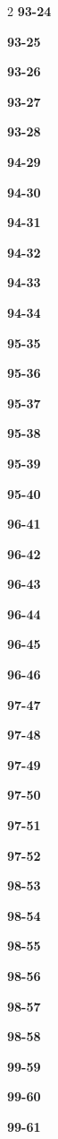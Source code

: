 \documentclass[10pt,a4paper]{article}
\begin{document}
\begin{multicols}{2}
\noindent\textbf{93-24}\ \par
\noindent\textbf{93-25}\ \par
\noindent\textbf{93-26}\ \par
\noindent\textbf{93-27}\ \par
\noindent\textbf{93-28}\ \par
\noindent\textbf{94-29}\ \par
\noindent\textbf{94-30}\ \par
\noindent\textbf{94-31}\ \par
\noindent\textbf{94-32}\ \par
\noindent\textbf{94-33}\ \par
\noindent\textbf{94-34}\ \par
\noindent\textbf{95-35}\ \par
\noindent\textbf{95-36}\ \par
\noindent\textbf{95-37}\ \par
\noindent\textbf{95-38}\ \par
\noindent\textbf{95-39}\ \par
\noindent\textbf{95-40}\ \par
\noindent\textbf{96-41}\ \par
\noindent\textbf{96-42}\ \par
\noindent\textbf{96-43}\ \par
\noindent\textbf{96-44}\ \par
\noindent\textbf{96-45}\ \par
\noindent\textbf{96-46}\ \par
\noindent\textbf{97-47}\ \par
\noindent\textbf{97-48}\ \par
\noindent\textbf{97-49}\ \par
\noindent\textbf{97-50}\ \par
\noindent\textbf{97-51}\ \par
\noindent\textbf{97-52}\ \par
\noindent\textbf{98-53}\ \par
\noindent\textbf{98-54}\ \par
\noindent\textbf{98-55}\ \par
\noindent\textbf{98-56}\ \par
\noindent\textbf{98-57}\ \par
\noindent\textbf{98-58}\ \par
\noindent\textbf{99-59}\ \par
\noindent\textbf{99-60}\ \par
\noindent\textbf{99-61}\ \par

\end{multicols}
\end{document}
